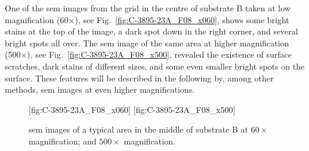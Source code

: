 


One of the \ac{sem} images from the grid in the centre of substrate B taken at low magnification (60$\times$), see Fig.~\ref{fig:C-3895-23A_F08_x060}, shows some bright stains at the top of the image, a dark spot down in the right corner, and several bright spots all over. The \ac{sem} image of the same area at higher magnification (500$\times$), see Fig.~\ref{fig:C-3895-23A_F08_x500}, revealed the existence of surface scratches, dark stains of different sizes, and some even smaller bright spots on the surface. These features will be described in the following by, among other methods, \ac{sem} images at even higher magnifications.

\begin{figure}[htbp]
    \centering
    [fig:C-3895-23A_F08_x060]
    \hfill
    [fig:C-3895-23A_F08_x500]
    \caption[\Ac{sem} images of a typical area in the middle of substrate B.]{\Ac{sem} images of a typical area in the middle of substrate B at  $60\times$ magnification; and  $500\times$ magnification.}
    \label{fig:SEM_C389523_overview}
\end{figure}

